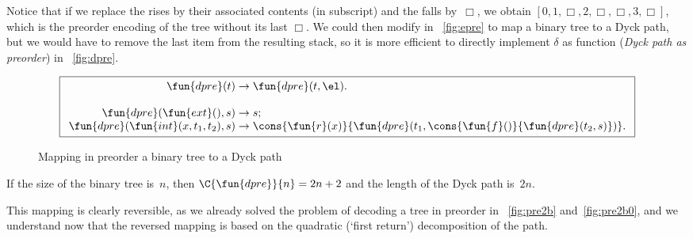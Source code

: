 Notice that if we replace the rises by their associated contents (in
subscript) and the falls by~\(\Box\), we obtain \([0, 1, \Box, 2,
\Box, \Box, 3, \Box]\), which is the preorder encoding of the tree without its last \(\Box\). We
could then modify  in
\fig~\vref{fig:epre} to map a binary tree to a Dyck
path, but we would have to remove the last item from the resulting
stack, so it is more efficient to directly implement \(\delta\) as
function  (\emph{Dyck path as
  preorder}) in \fig~\vref{fig:dpre}.
\begin{figure}[b]
\begin{equation*}
\boxed{
\begin{array}{r@{\;}c@{\;}l}
\fun{dpre}(t) & \rightarrow & \fun{dpre}(t,\el).\\
\\
\fun{dpre}(\fun{ext}(),s) & \rightarrow & s;\\
\fun{dpre}(\fun{int}(x,t_1,t_2),s)
  & \rightarrow
  & \cons{\fun{r}(x)}{\fun{dpre}(t_1,\cons{\fun{f}()}{\fun{dpre}(t_2,s)})}.
\end{array}}
\end{equation*}
\caption{Mapping in preorder a binary tree to a Dyck path}
\label{fig:dpre}
\end{figure}
If the size of the binary tree is~\(n\), then \(\C{\fun{dpre}}{n} =
2n+2\) and the length of the Dyck path
is~\(2n\).

This mapping is clearly reversible, as we already solved the problem
of decoding a tree in preorder in
\figs~\ref{fig:pre2b}
and~\vref{fig:pre2b0}, and we
understand now that the reversed mapping is based on the quadratic
(`first return') decomposition of the path. 

